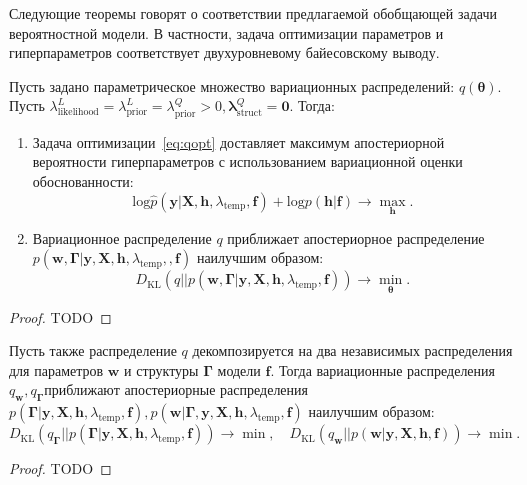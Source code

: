 Следующие теоремы говорят о соответствии предлагаемой обобщающей задачи вероятностной модели. В частности, задача оптимизации параметров и гиперпараметров соответствует двухуровневому байесовскому выводу.
\begin{theorem}
Пусть задано параметрическое множество вариационных распределений: $q(\boldsymbol{\theta})$. 
Пусть ${\lambda^L_\text{likelihood}} = {\lambda^L_\text{prior}=\lambda^Q_\text{prior}}>0, {\boldsymbol{\lambda}^Q_{\text{struct}}}=\mathbf{0}$. Тогда:
\begin{enumerate}
\item Задача оптимизации~\eqref{eq:qopt} доставляет максимум апостериорной вероятности гиперпараметров с использованием вариационной оценки обоснованности:
\vspace{-0.3cm}
\[
    \text{log}\hat{p}(\mathbf{y}|\mathbf{X}, \mathbf{h}, \lambda_\text{temp}, \mathbf{f}) + {\text{log}p(\mathbf{h}|\mathbf{f})} \to \max_{\mathbf{h}}.
\]
\item Вариационное распределение $q$ приближает апостериорное распределение $p(\mathbf{w}, \boldsymbol{\Gamma}|\mathbf{y}, \mathbf{X}, \mathbf{h}, \lambda_\text{temp},, \mathbf{f})$ наилучшим образом:
\vspace{-0.3cm}
\[
    {D}_\text{KL}(q||p(\mathbf{w}, \boldsymbol{\Gamma}|\mathbf{y}, \mathbf{X}, \mathbf{h}, \lambda_\text{temp}, \mathbf{f})) \to \min_{\boldsymbol{\theta}}.
\]
\end{enumerate}
\end{theorem}
\begin{proof}
TODO
\end{proof}
\begin{theorem}
Пусть также распределение $q$ декомпозируется на два независимых распределения для параметров $\mathbf{w}$ и структуры $\boldsymbol{\Gamma}$ модели $\mathbf{f}$.
Тогда вариационные распределения $q_{\mathbf{w}}, q_{\boldsymbol{\Gamma}}$приближают апостериорные распределения $ p(\boldsymbol{\Gamma}|\mathbf{y}, \mathbf{X}, \mathbf{h}, \lambda_\text{temp}, \mathbf{f}), p(\mathbf{w}|\boldsymbol{\Gamma},\mathbf{y}, \mathbf{X}, \mathbf{h}, \lambda_\text{temp}, \mathbf{f})$ наилучшим образом:
\[
    {D}_\text{KL}(q_{\boldsymbol{\Gamma}}||p(\boldsymbol{\Gamma}|\mathbf{y}, \mathbf{X}, \mathbf{h}, \lambda_\text{temp}, \mathbf{f})) \to \min, \quad
    {D}_\text{KL}(q_{\mathbf{w}}||p(\mathbf{w}|\mathbf{y}, \mathbf{X}, \mathbf{h}, \mathbf{f})) \to \min.
\]
\end{theorem}
\begin{proof}
TODO
\end{proof}


